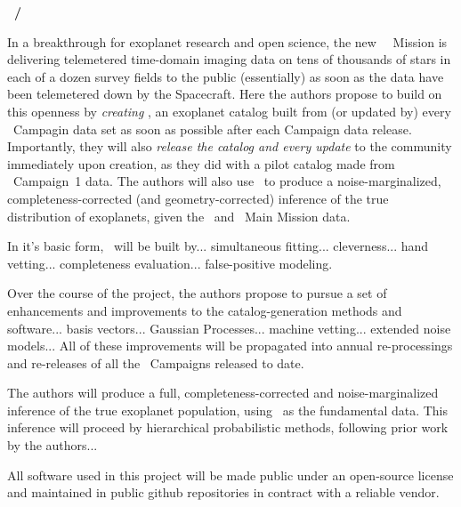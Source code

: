 \documentclass[12pt]{article}
\begin{document}
\noindent\textbf{\shortauthor~/~\fulltitle}
\bigskip

In a breakthrough for exoplanet research and open science, the new
\kepler\ \ketu\ Mission is delivering telemetered time-domain imaging
data on tens of thousands of stars in each of a dozen survey fields to
the public (essentially) as soon as the data have been telemetered
down by the Spacecraft.
Here the authors propose to build on this openness by \emph{creating
  \catalogname}, an exoplanet catalog built from (or updated by)
every \ketu\ Campagin data set as soon as possible after each Campaign
data release.
Importantly, they will also \emph{release the catalog and every
  update} to the community immediately upon creation, as they did with
a pilot catalog made from \ketu\ Campaign~1 data.
The authors will also use \catalogname\ to produce a noise-marginalized,
completeness-corrected (and geometry-corrected) inference of the true
distribution of exoplanets, given the \ketu\ and \kepler\ Main Mission
data.

In it's basic form, \catalogname\ will be built by... simultaneous
fitting... cleverness... hand vetting... completeness
evaluation... false-positive modeling.

Over the course of the project, the authors propose to pursue a set of
enhancements and improvements to the catalog-generation methods and
software... basis vectors... Gaussian Processes... machine
vetting... extended noise models...
All of these improvements will be propagated into annual
re-processings and re-releases of all the \ketu\ Campaigns released to
date.

The authors will produce a full, completeness-corrected and
noise-marginalized inference of the true exoplanet population, using
\catalogname\ as the fundamental data.
This inference will proceed by hierarchical probabilistic methods,
following prior work by the authors...

All software used in this project will be made public under an
open-source license and maintained in public github repositories in
contract with a reliable vendor.
\end{document}
